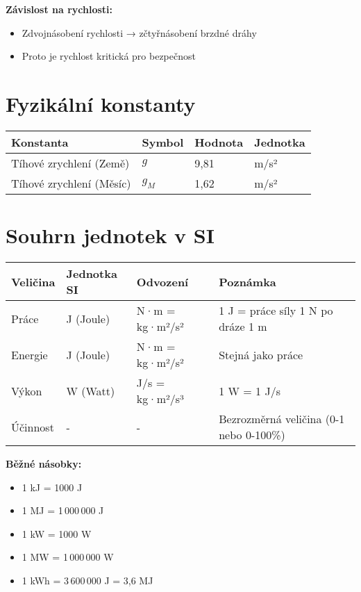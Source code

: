 \documentclass[11pt,a4paper]{article}
\begin{document}
\textbf{Závislost na rychlosti:}
\begin{itemize}
\item Zdvojnásobení rychlosti → zčtyřnásobení brzdné dráhy
\item Proto je rychlost kritická pro bezpečnost
\end{itemize}

\clearpage

\section{Fyzikální konstanty}

\begin{longtable}{llll}
\toprule
Konstanta & Symbol & Hodnota & Jednotka \\
\midrule
Tíhové zrychlení (Země) & $g$ & 9,81 & m/s² \\
Tíhové zrychlení (Měsíc) & $g_M$ & 1,62 & m/s² \\
\bottomrule
\end{longtable}

\clearpage

\section{Souhrn jednotek v SI}

\begin{longtable}{llll}
\toprule
Veličina & Jednotka SI & Odvození & Poznámka \\
\midrule
Práce & J (Joule) & N·m = kg·m²/s² & 1 J = práce síly 1 N po dráze 1 m \\
Energie & J (Joule) & N·m = kg·m²/s² & Stejná jako práce \\
Výkon & W (Watt) & J/s = kg·m²/s³ & 1 W = 1 J/s \\
Účinnost & - & - & Bezrozměrná veličina (0-1 nebo 0-100\%) \\
\bottomrule
\end{longtable}

\textbf{Běžné násobky:}
\begin{itemize}
\item 1 kJ = 1000 J
\item 1 MJ = 1\,000\,000 J
\item 1 kW = 1000 W
\item 1 MW = 1\,000\,000 W
\item 1 kWh = 3\,600\,000 J = 3,6 MJ
\end{itemize}

\clearpage
\end{document}
